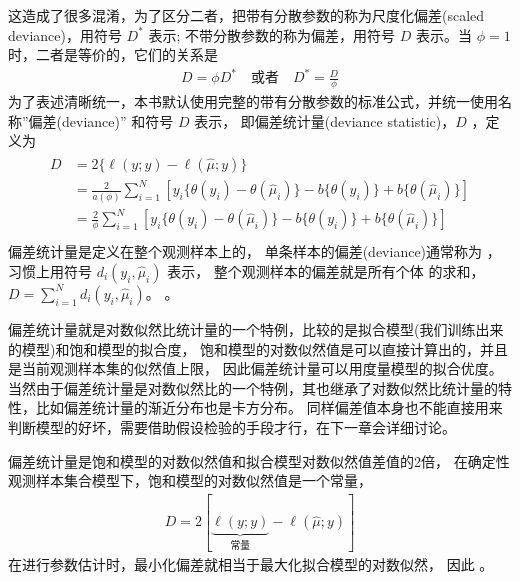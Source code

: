 \documentclass[letterpaper,10pt,english]{sphinxmanual}
\begin{document}
这造成了很多混淆，为了区分二者，把带有分散参数的称为尺度化偏差(scaled deviance)，用符号 \(D^*\) 表示;
不带分散参数的称为偏差，用符号 \(D\) 表示。当 \(\phi=1\) 时，二者是等价的，它们的关系是
\begin{equation}\label{equation:模型评估/content:模型评估/content:10}
\begin{split}D = \phi D^*
\quad \text{或者} \quad
D^* = \frac{D}{\phi}\end{split}
\end{equation}
为了表述清晰统一，本书默认使用完整的带有分散参数的标准公式，并统一使用名称”偏差(deviance)” 和符号 \(D\) 表示，
即偏差统计量(deviance statistic)，\(D\) ，定义为
\begin{align}\label{equation:模型评估/content:模型评估/content:11}\!\begin{aligned}
D &= 2 \{ \ell(y;y)-\ell(\hat{\mu};y)\}\\
&= \frac{2}{a(\phi)} \sum_{i=1}^N  [
y_i \{ \theta(y_i) - \theta(\hat{\mu}_i) \} - b\{\theta(y_i)\} + b\{\theta(\hat{\mu}_i)\} ]\\
&= \frac{2}{\phi} \sum_{i=1}^N  [
y_i \{ \theta(y_i) - \theta(\hat{\mu}_i) \} - b\{\theta(y_i)\} + b\{\theta(\hat{\mu}_i)\} ]\\
\end{aligned}\end{align}
偏差统计量是定义在整个观测样本上的，
单条样本的偏差(deviance)通常称为 ，习惯上用符号 \(d_i(y_i,\hat{\mu}_i)\) 表示，
整个观测样本的偏差就是所有个体  的求和，\(D=\sum_{i=1}^N d_i(y_i,\hat{\mu}_i)\)。
。

偏差统计量就是对数似然比统计量的一个特例，比较的是拟合模型(我们训练出来的模型)和饱和模型的拟合度，
饱和模型的对数似然值是可以直接计算出的，并且是当前观测样本集的似然值上限，
因此偏差统计量可以用度量模型的拟合优度。
当然由于偏差统计量是对数似然比的一个特例，其也继承了对数似然比统计量的特性，比如偏差统计量的渐近分布也是卡方分布。
同样偏差值本身也不能直接用来判断模型的好坏，需要借助假设检验的手段才行，在下一章会详细讨论。


偏差统计量是饱和模型的对数似然值和拟合模型对数似然值差值的2倍，
在确定性观测样本集合模型下，饱和模型的对数似然值是一个常量，
\begin{equation}\label{equation:模型评估/content:模型评估/content:12}
\begin{split}D = 2 [ \underbrace{\ell(y;y)}_{\text{常量}}-\ell(\hat{\mu};y) ]\end{split}
\end{equation}
在进行参数估计时，最小化偏差就相当于最大化拟合模型的对数似然，
因此 。
\end{document}
